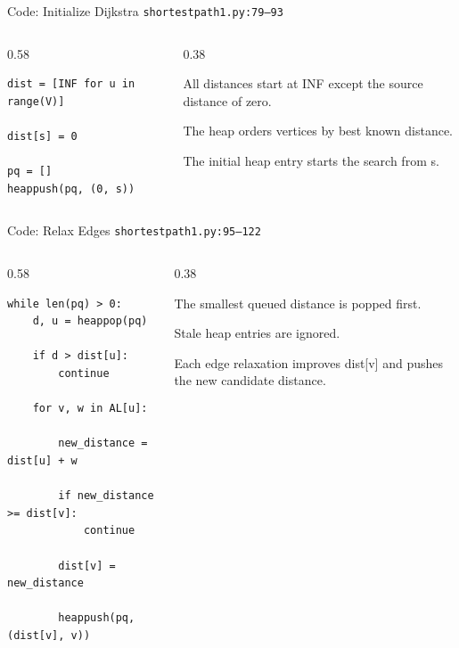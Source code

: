 \documentclass[aspectratio=169,11pt]{beamer}
\begin{document}
\begin{frame}[fragile]{Code: Initialize Dijkstra}
\scriptsize
{} \texttt{shortestpath1.py:79--93}

\vspace{0.08cm}
\begin{columns}[T,totalwidth=\textwidth]
\begin{column}{0.58\textwidth}
\begin{lstlisting}[style=cpcode]
dist = [INF for u in range(V)]

dist[s] = 0

pq = []
heappush(pq, (0, s))
\end{lstlisting}
\end{column}
\begin{column}{0.38\textwidth}
\begin{tightitemize}
  \item All distances start at INF except the source distance of zero.
  \item The heap orders vertices by best known distance.
  \item The initial heap entry starts the search from s.
\end{tightitemize}
\end{column}
\end{columns}
\end{frame}

\begin{frame}[fragile]{Code: Relax Edges}
\scriptsize
{} \texttt{shortestpath1.py:95--122}

\vspace{0.08cm}
\begin{columns}[T,totalwidth=\textwidth]
\begin{column}{0.58\textwidth}
\begin{lstlisting}[style=cpcode]
while len(pq) > 0:
    d, u = heappop(pq)

    if d > dist[u]:
        continue

    for v, w in AL[u]:

        new_distance = dist[u] + w

        if new_distance >= dist[v]:
            continue

        dist[v] = new_distance

        heappush(pq, (dist[v], v))
\end{lstlisting}
\end{column}
\begin{column}{0.38\textwidth}
\begin{tightitemize}
  \item The smallest queued distance is popped first.
  \item Stale heap entries are ignored.
  \item Each edge relaxation improves dist[v] and pushes the new candidate distance.
\end{tightitemize}
\end{column}
\end{columns}
\end{frame}
\end{document}
